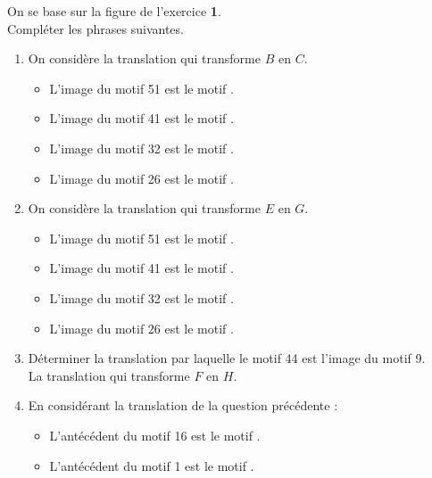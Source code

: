 \begin{corrige}
    On se base sur la figure de l'exercice {\bfseries 1}.\\ Compléter les phrases suivantes.\\
    \begin{changemargin}{0mm}{-5mm}
        \begin{enumerate}
            \item On considère la translation qui transforme $B$ en $C$.
            \begin{itemize}
                \item L'image du motif \num{51} est le motif {}.
                \item L'image du motif \num{41} est le motif {}.
                \item L'image du motif \num{32} est le motif {}.
                \item L'image du motif \num{26} est le motif {}.
            \end{itemize}
            \item On considère la translation qui transforme $E$ en $G$.
            \begin{itemize}
                \item L'image du motif \num{51} est le motif {}.
                \item L'image du motif \num{41} est le motif {}.
                \item L'image du motif \num{32} est le motif {}.
                \item L'image du motif \num{26} est le motif {}.
            \end{itemize}
            \item Déterminer la translation par laquelle le motif \num{44} est l'image du motif \num{9}.\\
            {\red La translation qui transforme $F$ en $H$.}
            \item En considérant la translation de la question précédente :
            \begin{itemize}
                \item L'antécédent du motif \num{16} est le motif {}.
                \item L'antécédent du motif \num{1} est le motif {}.
            \end{itemize}
        \end{enumerate}
    \end{changemargin}
\end{corrige}

